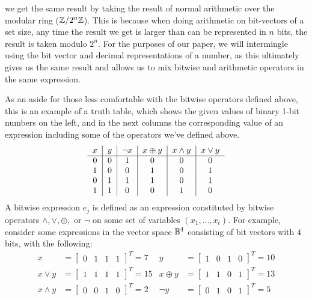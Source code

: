 we get the same result by taking the result of normal arithmetic over the modular ring
($\mathbb{Z}/2^n\mathbb{Z}$). This is because when doing arithmetic on bit-vectors of a set size,
any time the result we get is larger than can be represented in $n$ bits, the result
is taken modulo $2^n$. For the purposes of our paper, we will intermingle using the
bit vector and decimal representations of a number, as this ultimately gives us the
same result and allows us to mix bitwise and arithmetic operators in the same
expression.
\par As an aside for those less comfortable with the bitwise operators defined above,
this is an example of a truth table, which shows the given values of binary 1-bit
numbers on the left, and in the next columns the corresponding value of an
expression including some of the operators we've defined above.
\begin{align*}
    \begin{tabular}{c|c|c|c|c|c}
        $x$ & $y$ & $\neg x$ & $x \oplus y$ & $x \land y$ & $x \lor y$\\
        \hline
        0 & 0 & 1 & 0 & 0 & 0\\
        1 & 0 & 0 & 1 & 0 & 1\\
        0 & 1 & 1 & 1 & 0 & 1\\
        1 & 1 & 0 & 0 & 1 & 0\\
    \end{tabular}
\end{align*}
 {
    A bitwise expression $e_j$ is defined as an expression constituted by
    bitwise operators $\land, \lor, \oplus,$ or $\neg$ on some set of variables
    $(x_1, \dots, x_t)$. For example, consider some expressions in the vector space $\mathbb{B}^4$ consisting
    of bit vectors with $4$ bits, with the following:
    \begin{align*}
        x &= \begin{bmatrix}
        0 & 1 & 1 & 1
    \end{bmatrix}^T = 7 & y &= \begin{bmatrix}
        1 & 0 & 1 & 0
    \end{bmatrix}^T = 10
    \\
    x \lor y &= \begin{bmatrix}
        1 & 1 & 1 & 1
    \end{bmatrix}^T = 15
             & x \oplus y &= \begin{bmatrix}
                  1 & 1 & 0 & 1
              \end{bmatrix}^T = 13
    \\
        x \land y &=
        \begin{bmatrix}
            0 & 0 & 1 & 0
        \end{bmatrix}^T = 2 & \neg y &= \begin{bmatrix}
        0 & 1 & 0 & 1
        \end{bmatrix}^T
        = 5
    \end{align*}
}
